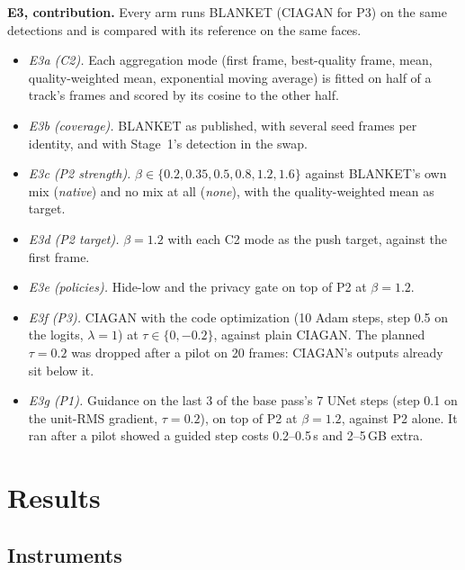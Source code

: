 \textbf{E3, contribution.} Every arm runs BLANKET (CIAGAN for P3) on the same
detections and is compared with its reference on the same faces.
\begin{itemize}
\item \emph{E3a (C2).} Each aggregation mode (first frame, best-quality frame,
mean, quality-weighted mean, exponential moving average) is fitted on half of a
track's frames and scored by its cosine to the other half.
\item \emph{E3b (coverage).} BLANKET as published, with several seed frames per
identity, and with Stage~1's detection in the swap.
\item \emph{E3c (P2 strength).} $\beta \in \{0.2, 0.35, 0.5, 0.8, 1.2, 1.6\}$
against BLANKET's own mix (\emph{native}) and no mix at all (\emph{none}), with
the quality-weighted mean as target.
\item \emph{E3d (P2 target).} $\beta = 1.2$ with each C2 mode as the push target,
against the first frame.
\item \emph{E3e (policies).} Hide-low and the privacy gate on top of P2 at
$\beta = 1.2$.
\item \emph{E3f (P3).} CIAGAN with the code optimization (10 Adam steps, step
0.5 on the logits, $\lambda = 1$) at $\tau \in \{0, -0.2\}$, against plain CIAGAN.
The planned $\tau = 0.2$ was dropped after a pilot on 20 frames: CIAGAN's
outputs already sit below it.
\item \emph{E3g (P1).} Guidance on the last 3 of the base pass's 7 UNet steps
(step 0.1 on the unit-RMS gradient, $\tau = 0.2$), on top of P2 at
$\beta = 1.2$, against P2 alone. It ran after a pilot showed a guided step costs
0.2--0.5\,s and 2--5\,GB extra. %
\end{itemize}

\section{Results}

\subsection{Instruments}

\begin{table}[ht]\centering
\caption{Recognizers on real faces of each video: in-domain threshold and true-accept rate at FAR 1\%.}
\label{tab:recognizers}

\end{table}


